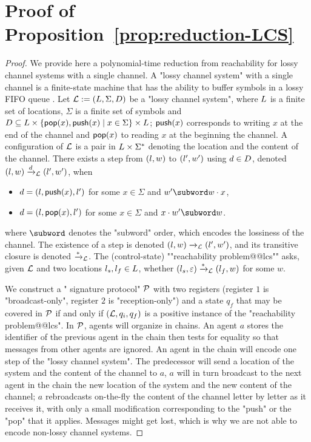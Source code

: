 \section{Proof of Proposition~\ref{prop:reduction-LCS}}
\label{app:reduction-lcs}

\propReductionLCS*
\begin{proof}
	We provide here a polynomial-time reduction from reachability for lossy channel systems with a single channel. A "lossy channel system" with a single channel is a finite-state machine that has the ability to buffer symbols in a lossy FIFO queue \cite{Schnoebelen2002verifying}. 
	Let $\mathcal{L} := (L,\Sigma, D)$ be a "lossy channel system", where $L$ is a finite set of locations, $\Sigma$ is a finite set of symbols and $D \subseteq L \times \{\mathsf{pop}(x), \mathsf{push}(x) \mid x \in \Sigma\} \times L$; $\mathsf{push}(x)$ corresponds to writing $x$ at the end of the channel and $\mathsf{pop}(x)$ to reading $x$ at the beginning the channel. A configuration of $\mathcal{L}$ is a pair in $L \times \Sigma^*$ denoting the location and the content of the channel. There exists a step from $(l,w)$ to $(l',w')$ using $d \in D$, denoted $(l,w) \xrightarrow{d}_{\mathcal{L}} (l',w')$, when
	\begin{itemize}
		\item $d = (l,\mathsf{push}(x),l')$ for some $x \in \Sigma$ and $w' \subword w \cdot x$,
		\item $d = (l,\mathsf{pop}(x),l')$ for some $x \in \Sigma$ and $x \cdot w' \subword w$.
	\end{itemize}
	where $\subword$ denotes the "subword" order, which encodes the lossiness of the channel. 
	The existence of a step is denoted $(l,w) \xrightarrow{}_{\mathcal{L}} (l',w')$, and its transitive closure is denoted $\xrightarrow{*}_{\mathcal{L}}$. The (control-state) ""reachability problem@@lcs"" asks, given $\mathcal{L}$ and two locations $l_s, l_f \in L$, whether $(l_s,\varepsilon) \xrightarrow{*}_{\mathcal{L}} (l_f, w)$ for some $w$. 
	
	We construct a " signature protocol" $\mathcal{P}$ with two registers (register $1$ is "broadcast-only", register $2$ is "reception-only") and a state $q_f$ that may be covered in $\mathcal{P}$ if and only if $(\mathcal{L}, q_i, q_f)$ is a positive instance of the "reachability problem@@lcs". 
	In $\mathcal{P}$, agents will organize in chains.
	An agent $a$ stores the identifier of the previous agent in the chain then tests for equality so that messages from other agents are ignored. An agent in the chain will encode one step of the "lossy channel system". 
	The predecessor will send a location of the system and the content of the channel to $a$, $a$ will in turn broadcast to the next agent in the chain the new location of the system and the new content of the channel; $a$ rebroadcasts on-the-fly the content of the channel letter by letter as it receives it, with only a small modification corresponding to the "push" or the "pop" that it applies. Messages might get lost, which is why we are not able to encode non-lossy channel systems.
	


\end{proof}
